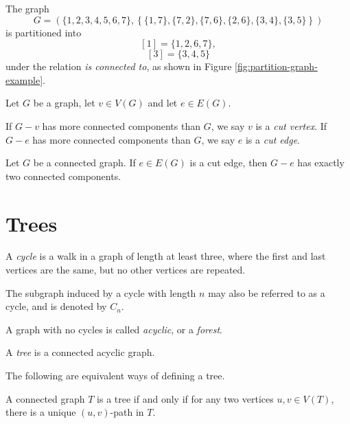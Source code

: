 \begin{exmp}
    The graph
    \[G = (\{1, 2, 3, 4, 5, 6, 7\}, \left\{\{1, 7\}, \{7, 2\}, \{7, 6\}, \{2, 6\}, \{3, 4\}, \{3, 5\}\right\})\]
    is partitioned into
    \[[1] = \{1, 2, 6, 7\},\]
    \[[3] = \{3, 4, 5\}\] under the relation \emph{is connected to}, as shown in Figure \ref{fig:partition-graph-example}.
\end{exmp}

\begin{defn}
    Let $G$ be a graph, let $v \in V(G)$ and let $e \in E(G)$.

    If $G - v$ has more connected components than $G$, we say $v$ is a \emph{cut vertex}. If $G - e$ has more connected components than $G$, we say $e$ is a \emph{cut edge}.
\end{defn}

\begin{thm}
    Let $G$ be a connected graph. If $e \in E(G)$ is a cut edge, then $G - e$ has exactly two connected components.
\end{thm}

\section{Trees}

\begin{defn}
    A \emph{cycle} is a walk in a graph of length at least three, where the first and last vertices are the same, but no other vertices are repeated.
\end{defn}

\begin{rmk}
    The subgraph induced by a cycle with length $n$ may also be referred to as a cycle, and is denoted by $C_n$.
\end{rmk}

\begin{defn}
    A graph with no cycles is called \emph{acyclic}, or a \emph{forest}.
\end{defn}

\begin{defn}
    A \emph{tree} is a connected acyclic graph.
\end{defn}

\begin{rmk}
    The following are equivalent ways of defining a tree.
\end{rmk}

\begin{thm}\label{tree-unique-path}
    A connected graph $T$ is a tree if and only if for any two vertices $u, v \in V(T)$, there is a unique $(u, v)$-path in $T$.
\end{thm}


